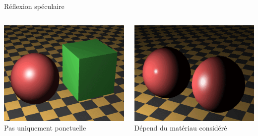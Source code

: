 \begin{frame}[t]{Réflexion spéculaire}
  \begin{columns}
    \begin{column}{.49\textwidth}
      \includegraphics[width=\textwidth]{figs/spec1.png} \\
      Pas uniquement ponctuelle
    \end{column}
    \begin{column}{.49\textwidth}
      \includegraphics[width=\textwidth]{figs/spec2.png} \\
      Dépend du matériau considéré
    \end{column}
  \end{columns}
\end{frame}

